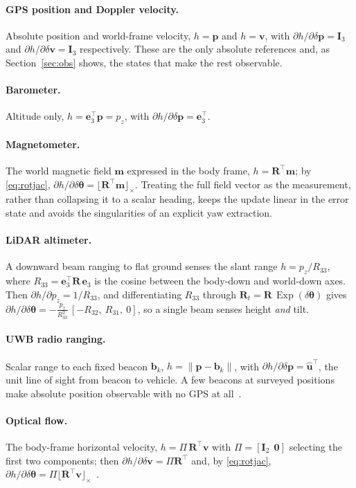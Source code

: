 \documentclass[11pt]{article}
\newcommand{\R}{\mathbf{R}}
\newcommand{\I}{\mathbf{I}}
\newcommand{\bp}{\mathbf{p}}
\newcommand{\bv}{\mathbf{v}}
\newcommand{\bmm}{\mathbf{m}}
\newcommand{\be}{\mathbf{e}}
\newcommand{\bu}{\mathbf{u}}
\newcommand{\bb}{\mathbf{b}}
\newcommand{\skewm}[1]{\lfloor #1 \rfloor_\times}
\newcommand{\dtheta}{\delta\bm{\theta}}
\DeclareMathOperator{\Exp}{Exp}
\begin{document}
\paragraph{GPS position and Doppler velocity.}
Absolute position and world-frame velocity, $h=\bp$ and $h=\bv$, with
$\partial h/\partial\delta\bp = \I_3$ and $\partial h/\partial\delta\bv = \I_3$ respectively. These are
the only absolute references and, as Section~\ref{sec:obs} shows, the states that make the rest
observable.

\paragraph{Barometer.}
Altitude only, $h=\be_3^\top\bp=p_z$, with $\partial h/\partial\delta\bp=\be_3^\top$.

\paragraph{Magnetometer.}
The world magnetic field $\bmm$ expressed in the body frame, $h=\R^\top\bmm$; by \eqref{eq:rotjac},
$\partial h/\partial\dtheta = \skewm{\R^\top\bmm}$. Treating the full field vector as the measurement,
rather than collapsing it to a scalar heading, keeps the update linear in the error state and avoids the
singularities of an explicit yaw extraction.

\paragraph{LiDAR altimeter.}
A downward beam ranging to flat ground senses the slant range $h = p_z / R_{33}$, where
$R_{33}=\be_3^\top\R\,\be_3$ is the cosine between the body-down and world-down axes. Then
$\partial h/\partial p_z = 1/R_{33}$, and differentiating $R_{33}$ through $\R_t=\R\,\Exp(\dtheta)$
gives $\partial h/\partial\dtheta = -\frac{p_z}{R_{33}^2}\,[-R_{32},\ R_{31},\ 0]$, so a single beam
senses height \emph{and} tilt.

\paragraph{UWB radio ranging.}
Scalar range to each fixed beacon $\bb_k$, $h=\lVert\bp-\bb_k\rVert$, with
$\partial h/\partial\delta\bp = \hat{\bu}^\top$, the unit line of sight from beacon to vehicle. A few
beacons at surveyed positions make absolute position observable with no GPS at
all~\cite{mueller2015}.

\paragraph{Optical flow.}
The body-frame horizontal velocity, $h = \Pi\,\R^\top\bv$ with $\Pi=[\I_2\ \ \mathbf 0]$ selecting the
first two components; then $\partial h/\partial\delta\bv = \Pi\R^\top$ and, by \eqref{eq:rotjac},
$\partial h/\partial\dtheta = \Pi\skewm{\R^\top\bv}$~\cite{honegger2013}.
\end{document}
